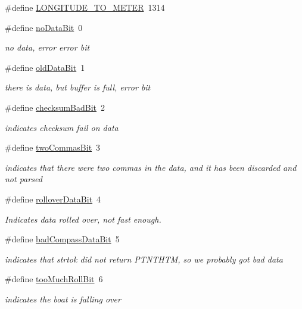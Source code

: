 \begin{DoxyCompactItemize}
\#define \hyperlink{group__globalconstants_ga5944046f3cb8cd99f5f71c1327ef8bc7}{\-L\-O\-N\-G\-I\-T\-U\-D\-E\-\_\-\-T\-O\-\_\-\-M\-E\-T\-E\-R}~1314
\item 
\#define \hyperlink{group__globalconstants_ga1bc4f63dcd0b30d09b7e320d0595695c}{no\-Data\-Bit}~0
\begin{DoxyCompactList}\small\item\em no data, error error bit \end{DoxyCompactList}\item 
\#define \hyperlink{group__globalconstants_gaed67540d9d2621c3a21a0f6eb8b75d01}{old\-Data\-Bit}~1
\begin{DoxyCompactList}\small\item\em there is data, but buffer is full, error bit \end{DoxyCompactList}\item 
\#define \hyperlink{group__globalconstants_gacd110736362ec97d7349dd67b527df39}{checksum\-Bad\-Bit}~2
\begin{DoxyCompactList}\small\item\em indicates checksum fail on data \end{DoxyCompactList}\item 
\#define \hyperlink{group__globalconstants_gae059b25098726f37143284774ef86a07}{two\-Commas\-Bit}~3
\begin{DoxyCompactList}\small\item\em indicates that there were two commas in the data, and it has been discarded and not parsed \end{DoxyCompactList}\item 
\#define \hyperlink{group__globalconstants_ga72f54d1e0beda470c8361ba984148900}{rollover\-Data\-Bit}~4
\begin{DoxyCompactList}\small\item\em \-Indicates data rolled over, not fast enough. \end{DoxyCompactList}\item 
\#define \hyperlink{group__globalconstants_ga69c4923d7bb43a1880f9fbb878bed927}{bad\-Compass\-Data\-Bit}~5
\begin{DoxyCompactList}\small\item\em indicates that strtok did not return \-P\-T\-N\-T\-H\-T\-M, so we probably got bad data \end{DoxyCompactList}\item 
\#define \hyperlink{group__globalconstants_ga808c40e80d82d52b2ceab81282ad35ec}{too\-Much\-Roll\-Bit}~6
\begin{DoxyCompactList}\small\item\em indicates the boat is falling over \end{DoxyCompactList}\item 

\end{DoxyCompactItemize}
